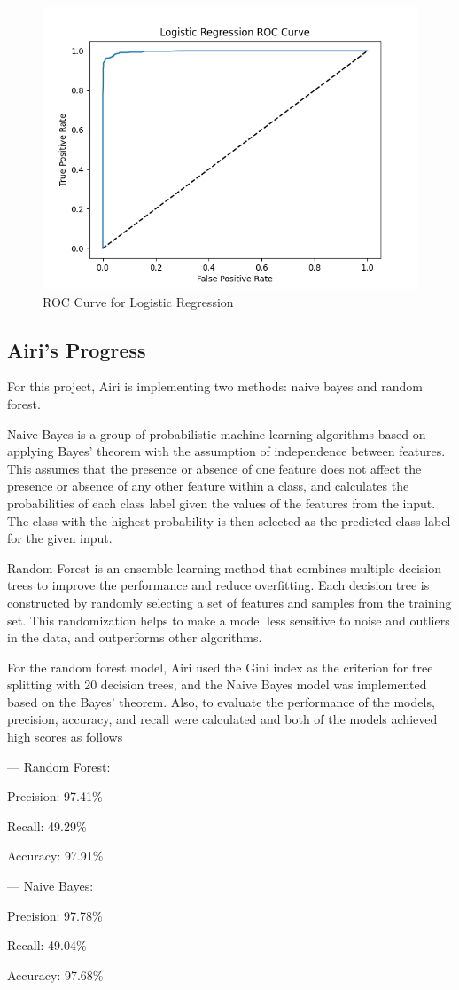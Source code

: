 \begin{figure}[H] %
    \centering
    \includegraphics[width=0.75\linewidth]{LogisticROC.png}
    \caption{ROC Curve for Logistic Regression}
\end{figure}

\subsection{Airi's Progress}

For this project, Airi is implementing two methods: naive bayes and random forest.

Naive Bayes is a group of probabilistic machine learning algorithms based on applying Bayes' theorem with the assumption of independence between features. This assumes that the presence or absence of one feature does not affect the presence or absence of any other feature within a class, and calculates the probabilities of each class label given the values of the features from the input. The class with the highest probability is then selected as the predicted class label for the given input.

Random Forest is an ensemble learning method that combines multiple decision trees to improve the performance and reduce overfitting. Each decision tree is constructed by randomly selecting a set of features and samples from the training set. This randomization helps to make a model less sensitive to noise and outliers in the data, and outperforms other algorithms.

For the random forest model, Airi used the Gini index as the criterion for tree splitting with 20 decision trees, and the Naive Bayes model was implemented based on the Bayes' theorem. Also, to evaluate the performance of the models, precision, accuracy, and recall were calculated and both of the models achieved high scores as follows

— Random Forest:

Precision: 97.41\% 

Recall: 49.29\%

Accuracy: 97.91\%

— Naive Bayes: 

Precision: 97.78\% 

Recall: 49.04\% 

Accuracy:  97.68\%